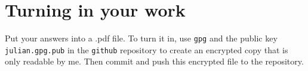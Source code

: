 \documentclass[11pt]{amsart}
\begin{document}



\bigskip
\section*{Turning in your work}

Put your answers into a .pdf file. To turn it in, use \texttt{gpg} and the public key \texttt{julian.gpg.pub} in the \texttt{github} repository to create an encrypted copy that is only readable by me. Then commit and push this encrypted file to the repository.
\end{document}
